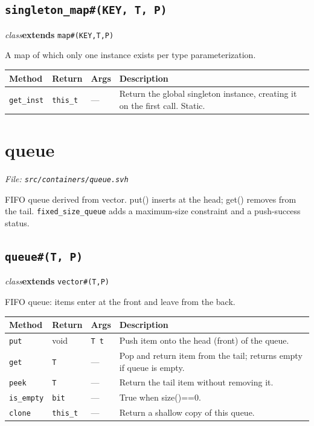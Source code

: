 \documentclass[11pt,letterpaper]{report}
\begin{document}
\subsection*{\texttt{singleton\_map\#(KEY, T, P)}}
\noindent\small\textit{class}\quad \textbf{extends} \texttt{map\#(KEY,T,P)}\par

A map of which only one instance exists per type parameterization.

\begin{xltabular}{\linewidth}{>{\small}p{1.35in} >{\small}p{1.25in} >{\small}p{0.95in} >{\small}X}
\toprule
\textbf{Method} & \textbf{Return} & \textbf{Args} & \textbf{Description} \\
\midrule
\endhead
\bottomrule
\endfoot
\texttt{get\_inst} & \texttt{this\_t} & --- & Return the global singleton instance, creating it on the first call. Static. \\
\end{xltabular}

\section{queue}
\noindent\small\textit{File: \texttt{src/containers/queue.svh}}\par

FIFO queue derived from vector. put() inserts at the head; get() removes from the tail. \texttt{fixed\_size\_queue} adds a maximum-size constraint and a push-success status.

\subsection*{\texttt{queue\#(T, P)}}
\noindent\small\textit{class}\quad \textbf{extends} \texttt{vector\#(T,P)}\par

FIFO queue: items enter at the front and leave from the back.

\begin{xltabular}{\linewidth}{>{\small}p{1.35in} >{\small}p{1.25in} >{\small}p{0.95in} >{\small}X}
\toprule
\textbf{Method} & \textbf{Return} & \textbf{Args} & \textbf{Description} \\
\midrule
\endhead
\bottomrule
\endfoot
\texttt{put} & void & \texttt{T t} & Push item onto the head (front) of the queue. \\
\texttt{get} & \texttt{T} & --- & Pop and return item from the tail; returns empty if queue is empty. \\
\texttt{peek} & \texttt{T} & --- & Return the tail item without removing it. \\
\texttt{is\_empty} & \texttt{bit} & --- & True when size()==0. \\
\texttt{clone} & \texttt{this\_t} & --- & Return a shallow copy of this queue. \\
\end{xltabular}
\end{document}
